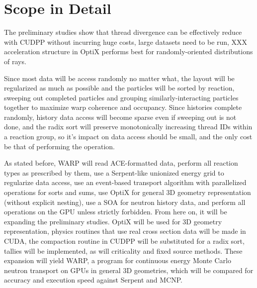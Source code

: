 
\section{Scope in Detail}

The preliminary studies show that thread divergence can be effectively reduce with CUDPP without incurring huge costs, large datasets need to be run, XXX acceleration structure in OptiX performs best for randomly-oriented distributions of rays. 

Since most data will be access randomly no matter what, the layout will be regularized as much as possible and the particles will be sorted by reaction, sweeping out completed particles and grouping similarly-interacting particles together to maximize warp coherence and occupancy.  Since histories complete randomly, history data access will become sparse even if sweeping out is not done, and the radix sort will preserve monotonically increasing thread IDs within a reaction group, so it's impact on data access should be small, and the only cost be that of performing the operation.

As stated before, WARP will read ACE-formatted data, perform all reaction types as prescribed by them, use a Serpent-like unionized energy grid to regularize data access, use an event-based transport algorithm with parallelized operations for sorts and sums, use OptiX for general 3D geometry representation (without explicit nesting), use a SOA for neutron history data, and perform all operations on the GPU unless strictly forbidden.  From here on, it will be expanding the preliminary studies.  OptiX will be used for 3D geometry representation, physics routines that use real cross section data will be made in CUDA, the compaction routine in CUDPP will be substituted for a radix sort, tallies will be implemented, as will criticality and fixed source methods.  These expansion will yield WARP, a program for continuous energy Monte Carlo neutron transport on GPUs in general 3D geometries, which will be compared for accuracy and execution speed against Serpent and MCNP.
